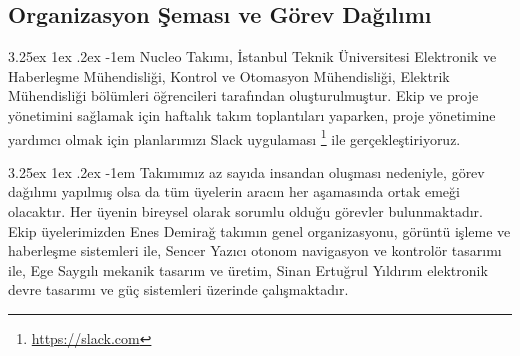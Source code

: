\documentclass[12pt]{article}
\makeatletter
\renewcommand\paragraph{\@startsection{paragraph}{5}{\z@}%
  {3.25ex \@plus1ex \@minus.2ex}%
  {-1em}%
  {\normalfont\normalsize\bfseries}}
\makeatother
\begin{document}
\begin{table}[hbt!]
\centering
{}
\caption{Takım Üyeleri}
\label{tab:takim-uyeleri}
\end{table}

\subsection{Organizasyon Şeması ve Görev Dağılımı}

\paragraph{} Nucleo Takımı, İstanbul Teknik Üniversitesi Elektronik ve Haberleşme Mühendisliği, Kontrol ve Otomasyon Mühendisliği, Elektrik Mühendisliği bölümleri öğrencileri tarafından oluşturulmuştur. Ekip ve proje yönetimini sağlamak için haftalık takım toplantıları yaparken, proje yönetimine yardımcı olmak için planlarımızı Slack uygulaması \footnote{\href{https://slack.com/}{https://slack.com}} ile gerçekleştiriyoruz. %

\paragraph{} Takımımız az sayıda insandan oluşması nedeniyle, görev dağılımı yapılmış olsa da tüm üyelerin aracın her aşamasında ortak emeği olacaktır. Her üyenin bireysel olarak sorumlu olduğu görevler bulunmaktadır. Ekip üyelerimizden Enes Demirağ takımın genel organizasyonu, görüntü işleme ve haberleşme sistemleri ile, Sencer Yazıcı otonom navigasyon ve kontrolör tasarımı ile, Ege Saygılı mekanik tasarım ve üretim, Sinan Ertuğrul Yıldırım elektronik devre tasarımı ve güç sistemleri üzerinde çalışmaktadır.
\end{document}
